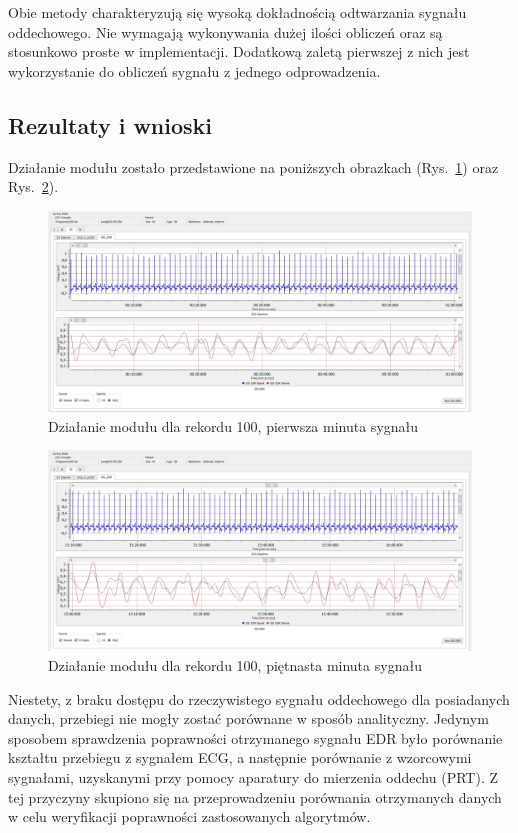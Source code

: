 		Obie metody charakteryzują się wysoką dokładnością odtwarzania sygnału oddechowego. Nie wymagają wykonywania dużej ilości obliczeń oraz są stosunkowo proste w implementacji. Dodatkową zaletą pierwszej z nich jest wykorzystanie do obliczeń sygnału z jednego odprowadzenia.
	   
\subsection{Rezultaty i wnioski}
 
		Działanie modułu zostało przedstawione na poniższych obrazkach (Rys.~\ref{fig:aplikacja_1}) oraz Rys.~\ref{fig:aplikacja_2}).
	   
\begin{figure}[h]
\centering
\includegraphics[width=12cm]{SIG_EDR/img/aplikacja_1_1.jpg}
\caption{Działanie modułu dla rekordu 100, pierwsza minuta sygnału}
\label{fig:aplikacja_1}
\end{figure}
 
\begin{figure}[h]
\centering
\includegraphics[width=12cm]{SIG_EDR/img/aplikacja_2_2.jpg}
\caption{Działanie modułu dla rekordu 100, piętnasta minuta sygnału}
\label{fig:aplikacja_2}
\end{figure}
 
		Niestety, z braku dostępu do rzeczywistego sygnału oddechowego dla posiadanych danych, przebiegi nie mogły zostać porównane w sposób analityczny. Jedynym sposobem sprawdzenia poprawności otrzymanego sygnału EDR było porównanie kształtu przebiegu z sygnałem ECG, a następnie porównanie z wzorcowymi sygnałami, uzyskanymi przy pomocy aparatury do mierzenia oddechu (PRT). Z tej przyczyny skupiono się na przeprowadzeniu porównania otrzymanych danych w celu weryfikacji poprawności zastosowanych algorytmów.
	   
